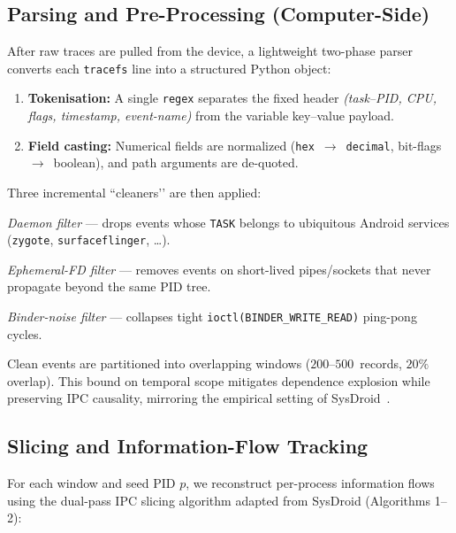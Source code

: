 \documentclass[a4paper,12pt]{report}
\begin{document}
\subsection{Parsing and Pre-Processing (Computer-Side)}

After raw traces are pulled from the device, a lightweight two-phase
parser converts each \texttt{tracefs} line into a structured Python
object:

\begin{enumerate}[label=(\roman*)]
  \item \textbf{Tokenisation:} A single \texttt{regex} separates the
        fixed header \emph{(task--PID, CPU, flags, timestamp,
        event-name)} from the variable key--value payload.

  \item \textbf{Field casting:} Numerical fields are normalized
        (\texttt{hex}~$\rightarrow$~\texttt{decimal},
        bit-flags~$\rightarrow$~boolean), and path arguments are de-quoted.
\end{enumerate}



\noindent
Three incremental “cleaners’’ are then applied:

\begin{compactitem}
  \item \emph{Daemon filter} — drops events whose \texttt{TASK} belongs
        to ubiquitous Android services (\texttt{zygote}, \texttt{surfaceflinger}, …).
  \item \emph{Ephemeral-FD filter} — removes events on short-lived
        pipes/sockets that never propagate beyond the same PID tree.
  \item \emph{Binder-noise filter} — collapses tight
        \texttt{ioctl(BINDER\_WRITE\_READ)} ping-pong cycles.
\end{compactitem}

\noindent
Clean events are partitioned into overlapping windows
($200$–$500$~records, $20\%$ overlap).
This bound on temporal scope mitigates dependence explosion while
preserving IPC causality, mirroring the empirical setting of
SysDroid~\cite{sysdroid2025}.


\subsection{Slicing and Information-Flow Tracking}

For each window and seed PID $p$, we reconstruct per-process
information flows using the dual-pass IPC slicing algorithm adapted
from SysDroid (Algorithms 1–2):
\end{document}
